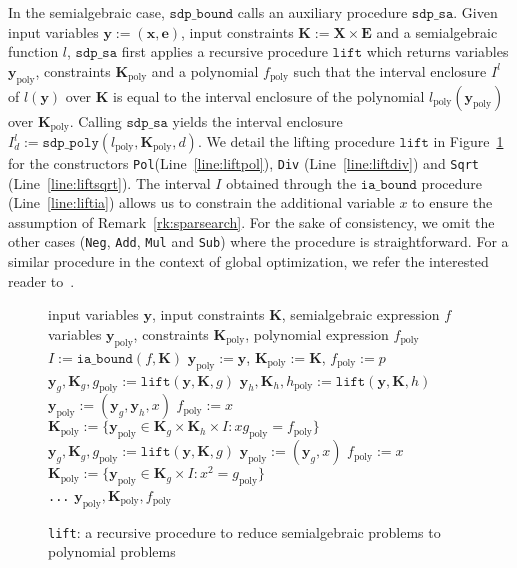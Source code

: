\documentclass[preprint]{sigplanconf}
\newcommand{\code}[1]{\lstinline{#1}}
\newcommand{\x}{\mathbf{x}}
\newcommand{\e}{\mathbf{e}}
\newcommand{\y}{\mathbf{y}}
\newcommand{\f}{\mathbf{f}}
\def\f{f}
\def\E{\mathbf{E}}
\def\K{\mathbf{K}}
\def\X{\mathbf{X}}
\newcommand{\iaboundfun}[2]{\mathtt{ia\_bound}(#1, #2)}
\newcommand{\iabound}{\mathtt{ia\_bound}}
\newcommand{\sdpbound}{\mathtt{sdp\_bound}}
\newcommand{\sdppolyfun}[3]{\mathtt{sdp\_poly}(#1, #2, #3)}
\newcommand{\liftfun}[3]{\mathtt{lift}(#1, #2, #3)}
\newcommand{\lift}{\mathtt{lift}}
\newcommand{\poly}{_\text{poly}}
\newcommand{\sdpsa}{\mathtt{sdp\_sa}}
\theoremstyle{plain}
\begin{document}
In the semialgebraic case, $\sdpbound$ calls an auxiliary procedure $\sdpsa$. 
Given input variables $\y := (\x,\e)$, input constraints $\K := \X \times \E$ and a 
semialgebraic function $l$,  $\sdpsa$ first applies a recursive procedure $\lift$ 
which returns variables $\y\poly$, constraints $\K\poly$ and a polynomial $f\poly$ such that the 
interval enclosure $I^l$ of $l(\y)$ over $\K$ is equal to the interval enclosure of 
the polynomial $l\poly(\y\poly)$ over $\K\poly$. 
Calling $\sdpsa$ yields the interval enclosure $I^l_d := \sdppolyfun{l\poly}{\K\poly}{d}$. We detail the lifting procedure $\lift$ in Figure~\ref{alg:lift} for the constructors \code{Pol}(Line~\eqref{line:liftpol}), \code{Div} (Line~\eqref{line:liftdiv}) and \code{Sqrt} (Line~\eqref{line:liftsqrt}). 
The interval $I$ obtained through the $\iabound$ procedure (Line~\eqref{line:liftia}) allows us to constrain the additional variable $x$ to ensure the assumption of Remark~\ref{rk:sparsearch}.
For the sake of consistency, we omit the other cases (\code{Neg}, \code{Add}, \code{Mul} and \code{Sub}) where the procedure is straightforward. For a similar procedure in the context of global optimization, we refer the interested reader to~\cite[Chapter 2]{MagronPhD}.

\begin{figure}[!ht]
\begin{algorithmic}[1]                 
\Require input variables $\y$, input constraints $\K$, semialgebraic expression $f$
\Ensure variables $\y\poly$, constraints $\K\poly$, polynomial expression $f\poly$
    \State $I := \iaboundfun{f}{\K}$ \label{line:liftia}
	 \label{line:liftpol} $\y\poly := \y$, $\K\poly := \K$, $\f\poly := p$
	 \label{line:liftdiv} 
	\State $\y_g, \K_g, g\poly := \liftfun{\y}{\K}{g}$ 
	\State $\y_h, \K_h, h\poly := \liftfun{\y}{\K}{h}$
    \State $\y\poly := (\y_g,\y_h,x)$ \hspace{1cm} $f\poly := x$ 
	\State $\K\poly := \{\y\poly \in \K_g \times \K_h \times I : x g\poly = f\poly \}$
	 \label{line:liftsqrt} 
	\State $\y_g, \K_g, g\poly := \liftfun{\y}{\K}{g}$ 
	\State $\y\poly := (\y_g,x)$ \hspace{1cm} $f\poly := x$ 
	\State $\K\poly := \{\y\poly \in \K_g \times I : x^2 = g\poly \}$\\
\code{...}
	\EndIf
%
\State \Return $\y\poly, \K\poly, f\poly$
\end{algorithmic}
\caption{\code{lift}: a recursive procedure to reduce semialgebraic problems to polynomial problems}
\label{alg:lift}
\end{figure}
\end{document}

